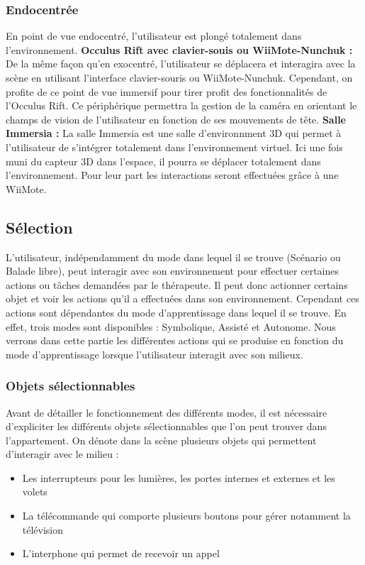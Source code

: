 \subsubsection{Endocentrée}
En point de vue endocentré, l’utilisateur est plongé totalement dans l’environnement. 
\newline
\textbf{Occulus Rift avec clavier-souis ou WiiMote-Nunchuk : }
De la même façon qu’en exocentré, l’utilisateur se déplacera et interagira avec la scène en utilisant l’interface clavier-souris ou WiiMote-Nunchuk. Cependant, on profite de ce point de vue immersif pour tirer profit des fonctionnalités de l’Occulus Rift.
Ce périphérique permettra la gestion de la caméra en orientant le champs de vision de l’utilisateur en fonction de ses mouvements de tête.
\newline
\textbf{Salle Immersia : }
La salle Immersia est une salle d’environnment 3D qui permet à l’utilisateur de s’intégrer totalement dans l’environnement virtuel. Ici une fois muni du capteur 3D dans l'espace, il pourra se déplacer totalement dans l’environnement.
Pour leur part les interactions seront effectuées grâce à une WiiMote.

\subsection{Sélection}

L'utilisateur, indépendamment du mode dans lequel il se trouve (Scénario ou Balade libre), peut interagir avec son environnement pour effectuer certaines actions ou tâches demandées par le thérapeute. Il peut donc actionner certains objet et voir les actions qu'il a effectuées dans son environnement. Cependant ces actions sont dépendantes du mode d'apprentissage dans lequel il se trouve. En effet, trois modes sont disponibles : Symbolique, Assisté et Autonome. Nous verrons dans cette partie les différentes actions qui se produise en fonction du mode d'apprentissage lorsque l'utilisateur interagit avec son milieux. 

\subsubsection{Objets sélectionnables}

Avant de détailler le fonctionnement des différents modes, il est nécessaire d'expliciter les différents objets sélectionnables que l'on peut trouver dans l'appartement. On dénote dans la scène plusieurs objets qui permettent d'interagir avec le milieu :
\begin{itemize}
	\item Les interrupteurs pour les lumières, les portes internes et externes et les volets
	\item La télécommande qui comporte plusieurs boutons pour gérer notamment la télévision
	\item L'interphone qui permet de recevoir un appel
\end{itemize}

